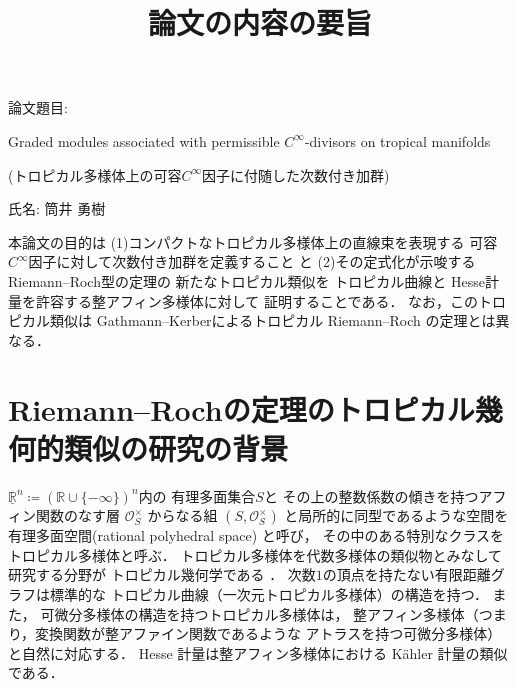 \documentclass[uplatex,dvipdfmx,12pt]{jsarticle}
\title{論文の内容の要旨
}
\date{}
\numberwithin{equation}{section}
\theoremstyle{definition}
\newcommand{\deq}{\coloneqq}
\newcommand{\beforesection}{\vspace{-15pt}}
\newcommand{\aftersection}{\vspace{-8pt}}
\begin{document}
\setlength{\baselineskip}{-5pt}
\setlength{\parskip}{2pt}


\maketitle
{\large
\noindent
論文題目:

Graded modules associated 
with permissible $C^{\infty}$-divisors on tropical manifolds

(トロピカル多様体上の可容$C^{\infty}$因子に付随した次数付き加群)
}

\vspace{5pt}

\noindent
{\large
氏名: 筒井 勇樹
}

\vspace{10pt}

\setlength{\baselineskip}{4pt}
\setlength{\parskip}{3pt}

本論文の目的は
(1)コンパクトなトロピカル多様体上の直線束を表現する
可容$C^{\infty}$因子に対して次数付き加群を定義すること
と
(2)その定式化が示唆するRiemann--Roch型の定理の
新たなトロピカル類似を
トロピカル曲線と
Hesse計量を許容する整アフィン多様体に対して
証明することである．
なお，このトロピカル類似は
Gathmann--Kerberによるトロピカル Riemann--Roch の定理とは異なる．

\beforesection

\section{Riemann--Rochの定理のトロピカル幾何的類似の研究の背景}

\aftersection

$\underline{\mathbb{R}}^{n} \deq (\mathbb{R}\cup\{-\infty\})^{n}$内の
有理多面集合$S$と
その上の整数係数の傾きを持つアフィン関数のなす層 
$\mathcal{O}_S^{\times}$
からなる組
$(S, \mathcal{O}_S^{\times})$
と局所的に同型であるような空間を
有理多面空間(rational polyhedral space)
と呼び，
その中のある特別なクラスをトロピカル多様体と呼ぶ．
トロピカル多様体を代数多様体の類似物とみなして研究する分野が
トロピカル幾何学である
\cite{mikhalkinTropicalEigenwaveIntermediate2014a,
gross2019sheaftheoretic}．
次数$1$の頂点を持たない有限距離グラフは標準的な
トロピカル曲線（一次元トロピカル多様体）の構造を持つ．
また，
可微分多様体の構造を持つトロピカル多様体は，
整アフィン多様体（つまり，変換関数が整アファイン関数であるような
アトラスを持つ可微分多様体）と自然に対応する．
Hesse 計量は整アフィン多様体における
K\"ahler 計量の類似である．
\end{document}
